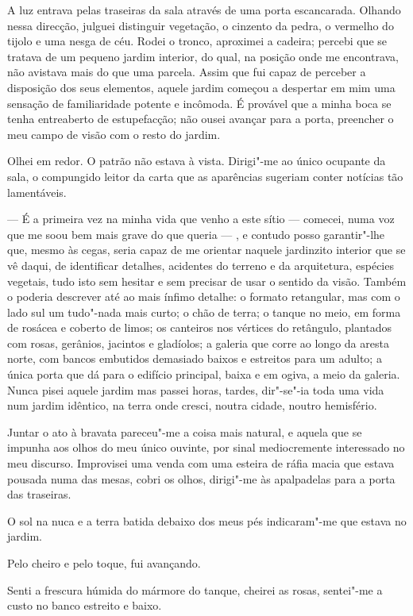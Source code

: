 A luz entrava pelas traseiras da sala através de uma porta escancarada.
Olhando nessa direcção, julguei distinguir vegetação, o cinzento da
pedra, o vermelho do tijolo e uma nesga de céu. Rodei o tronco,
aproximei a cadeira; percebi que se tratava de um pequeno jardim
interior, do qual, na posição onde me encontrava, não avistava mais do
que uma parcela. Assim que fui capaz de perceber a disposição dos seus
elementos, aquele jardim começou a despertar em mim uma sensação de
familiaridade potente e incômoda. É provável que a minha boca se tenha
entreaberto de estupefacção; não ousei avançar para a porta, preencher o
meu campo de visão com o resto do jardim.

Olhei em redor. O patrão não estava à vista. Dirigi"-me ao único ocupante
da sala, o compungido leitor da carta que as aparências sugeriam conter
notícias tão lamentáveis.

--- É a primeira vez na minha vida que venho a este sítio
--- comecei, numa voz que me soou bem mais grave do que queria --- , e
  contudo posso garantir"-lhe que, mesmo às cegas, seria capaz de me
  orientar naquele jardinzito interior que se vê daqui, de identificar
  detalhes, acidentes do terreno e da arquitetura, espécies vegetais,
  tudo isto sem hesitar e sem precisar de usar o sentido da visão.
  Também o poderia descrever até ao mais ínfimo detalhe: o formato
  retangular, mas com o lado sul um tudo"-nada mais curto; o
  chão de terra; o tanque no meio, em forma
de rosácea e coberto de limos; os canteiros nos vértices do retângulo,
plantados com rosas, gerânios, jacintos e gladíolos; a galeria que corre
ao longo da aresta norte, com bancos embutidos demasiado baixos e
estreitos para um adulto; a única porta que dá para o edifício
principal, baixa e em ogiva, a meio da galeria. Nunca pisei aquele
jardim mas passei horas, tardes, dir"-se"-ia toda uma vida num jardim
idêntico, na terra onde cresci, noutra cidade, noutro hemisfério.

Juntar o ato à bravata pareceu"-me a coisa mais natural, e aquela que se
impunha aos olhos do meu único ouvinte, por sinal mediocremente
interessado no meu discurso. Improvisei uma venda com uma esteira de
ráfia macia que estava pousada numa das mesas, cobri os olhos, dirigi"-me
às apalpadelas para a porta das traseiras.

O sol na nuca e a terra batida debaixo dos meus pés indicaram"-me que
estava no jardim.

Pelo cheiro e pelo toque, fui avançando.

Senti a frescura húmida do mármore do tanque, cheirei as rosas,
sentei"-me a custo no banco estreito e baixo.

